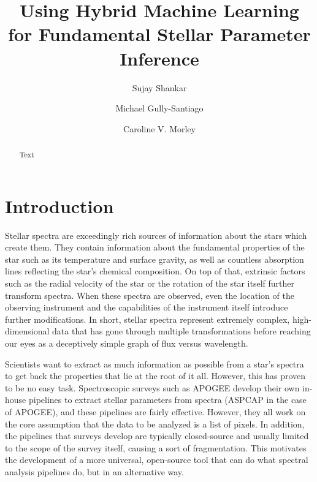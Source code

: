 \documentclass[twocolumn]{aastex631}
\begin{document}
\title{Using Hybrid Machine Learning for Fundamental Stellar Parameter Inference}
\author[0000-0002-2290-6810]{Sujay Shankar}
\author[0000-0002-4020-3457]{Michael Gully-Santiago}
\author[0000-0002-4404-0456]{Caroline V. Morley}

\begin{abstract}
    Text
\end{abstract}

\section{Introduction}
Stellar spectra are exceedingly rich sources of information about the stars
which create them. They contain information about the fundamental properties
of the star such as its temperature and surface gravity, as well as
countless absorption lines reflecting the star's chemical composition. On 
top of that, extrinsic factors such as the radial velocity of the star or 
the rotation of the star itself further transform spectra. When these spectra
are observed, even the location of the observing instrument and the 
capabilities of the instrument itself introduce further modifications. 
In short, stellar spectra represent extremely complex, high-dimensional 
data that has gone through multiple transformations before reaching our 
eyes as a deceptively simple graph of flux versus wavelength.

Scientists want to extract as much information as possible from
a star's spectra to get back the properties that lie at the root of it all. 
However, this has proven to be no easy task. Spectroscopic surveys such as 
APOGEE develop their own in-house pipelines to extract stellar parameters
from spectra (ASPCAP in the case of APOGEE), and these pipelines are fairly
effective. However, they all work on the core assumption that the data to be 
analyzed is a list of pixels. In addition, the pipelines that surveys 
develop are typically closed-source and usually limited to the scope of the 
survey itself, causing a sort of fragmentation. This motivates the 
development of a more universal, open-source tool that can do what spectral 
analysis pipelines do, but in an alternative way. 
\end{document}
